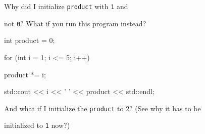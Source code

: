  Why did I initialize \texttt{product} with \texttt{1} and

not \texttt{0}? What if you run this program instead?

\begin{console}

int product = 0;

for (int i = 1; i <= 5; i++)

{   

    product *= i;

    std::cout << i << ' ' << product << std::endl;

}

\end{console}

And what if I initialize the \texttt{product} to 2? (See why it has to be

initialized to \texttt{1} now?)

